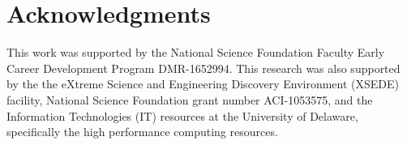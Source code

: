 \documentclass[%
twocolumn,
 amsmath,amssymb,
 aps, citeautoscript,
prb,
]{revtex4-1}
\begin{document}
\section{Acknowledgments}

This work was supported by the National Science Foundation Faculty Early Career Development Program DMR-1652994. This research was also supported by the the eXtreme Science and Engineering Discovery Environment (XSEDE) facility, National Science Foundation grant number ACI-1053575, and the Information Technologies (IT) resources at the University of Delaware, specifically the high performance computing resources.


\end{document}
